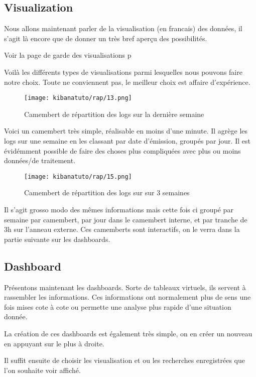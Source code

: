 \subsection{Visualization}
Nous allons maintenant parler de la visualisation (en francais) des données, il s'agit là encore
que de donner un très bref aperçu des possibilités.

Voir la page de garde des visualisations p\pageref{fig:kibanatuto7}

Voilà les différents types de visualisations parmi lesquelles nous pouvons faire 
notre choix. Toute ne conviennent pas, le meilleur choix est affaire d'expérience.


\begin{figure}[H]
\center
\texttt{[image: kibanatuto/rap/13.png]}
\label{fig:kibanatuto8}
\caption{Camembert de répartition des logs sur la dernière semaine}
\end{figure}
Voici un camembert très simple, réalisable en moins d'une minute. Il agrège les logs
sur une semaine en les classant par date d'émission, groupés par jour. 
Il est évidémment possible de faire des choses plus compliquées avec plus ou moins
données/de traitement.


\begin{figure}[H]
\center
\texttt{[image: kibanatuto/rap/15.png]}
\label{fig:kibanatuto9}
\caption{Camembert de répartition des logs sur sur 3 semaines}
\end{figure}
Il s'agit grosso modo des mêmes informations mais cette fois ci groupé par semaine
par camembert, par jour dans le camembert interne, et par tranche de 3h sur l'anneau
externe. Ces camemberts sont interactifs, on le verra dans la partie suivante sur 
les dashboards.


\subsection{Dashboard}
Présentons maintenant les dashboards. Sorte de tableaux virtuels, ils servent à rassembler
les informations. Ces informations ont normalement plus de sens une fois mises cote 
à cote ou permette une analyse plus rapide d'une situation donnée.

La création de ces dashboards est également très simple, on en créer un nouveau en 
appuyant sur le plus à droite.

Il suffit ensuite de choisir les visualisation et ou les recherches enregistrées 
que l'on souhaite voir affiché.\\[2mm]

